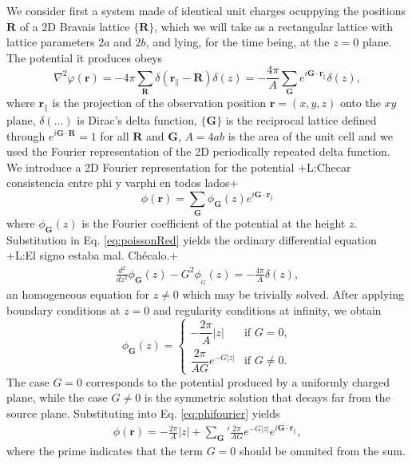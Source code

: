 \documentclass{article}
\newcommand{\abs}[1]{\lvert#1\rvert}
\newcommand{\notaL}[1]{{\color{blue}+L:#1+}}
\begin{document}
We consider first a system made of identical unit charges
ocuppying the positions $\bm R$ of a 2D Bravais lattice $\{\bm R\}$,
which we will take as a rectangular lattice with lattice parameters
$2a$ and $2b$, and lying, for the time being, at the $z=0$ plane.
The potential it produces obeys
\begin{equation}
  \label{eq:poissonRed}
  \nabla^2\varphi(\bm r)=-4\pi\sum_{\bm R}\delta(\bm r_\|-\bm
  R)\delta(z)=-\frac{4\pi}{A}\sum_{\bm G}e^{i\bm G\cdot\bm r_\|}\delta(z),
\end{equation}
where $\bm r_\|$ is the projection of the observation position $\bm
r=(x,y,z)$ onto the $xy$ plane,
$\delta(\ldots)$ is Dirac's delta function, $\{\bm G\}$ is the
reciprocal lattice defined through $e^{i\bm G\cdot\bm R}=1$ for all
$\bm R$ and $\bm G$, $A=4ab$ is the area of the unit cell
and we used the Fourier representation of the 2D
periodically repeated delta function. We introduce a 2D Fourier representation for
the potential \notaL{Checar consistencia entre phi y varphi en todos lados}
\begin{equation}
  \label{eq:phifourier}
  \phi(\bm r)=\sum_{\bm G}\phi_{\bm G}(z)e^{i\bm G\cdot\bm r_\|}
\end{equation}
where $\phi_{\bm G}(z)$ is the Fourier coefficient of the potential at
the height $z$. Substitution in Eq. \eqref{eq:poissonRed} yields the
ordinary differential equation \notaL{El signo estaba mal. Chécalo.}
 \begin{eqnarray}
 \frac{d^2}{dz^2}\phi_{\bm G}(z)-G^2\phi_{_{G}}(z)=
   -\frac{4 \pi}{A} \delta(z),
 \end{eqnarray}
an homogeneous equation for $z\ne0$ which may be trivially
solved. After applying boundary conditions at $z=0$ and regularity
conditions at infinity, we obtain
\begin{equation}
  \label{eq:phiG}
  \phi_{\bm G}(z)=
  \begin{cases}
    -\dfrac{2\pi}{A}\abs{z}&\text{if }G=0,\\
    \dfrac{2 \pi}{AG}  e^{- G \abs{z}}&\text{if }G\neq 0.
  \end{cases}
\end{equation}
The case $G=0$ corresponds to the potential produced by a uniformly charged plane,
while the case $G\ne 0$ is the symmetric solution that decays far from
the source plane. Substituting into Eq. \eqref{eq:phifourier} yields
\begin{eqnarray}
  \label{eq:phiG1}
 \phi(\bm r) = -\frac{2 \pi}{A}  \abs{z} +{\sum_{\bm G}}' \frac{2 \pi
   }{AG} e^{- G \abs{z}} e^{i \bm G\cdot\bm r_\|},
 \end{eqnarray}
where the prime indicates that the term $G=0$ should be ommited from
the sum.
\end{document}
